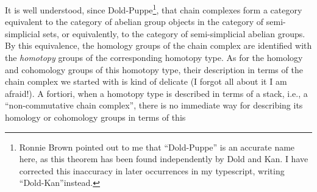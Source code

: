 It is well understood, since Dold-Puppe\footnote{Ronnie Brown pointed out to me that ``Dold-Puppe'' is an accurate name here, as this theorem has been found independently by Dold and Kan. I have corrected this inaccuracy in later occurrences in my typescript, writing ``Dold-Kan''instead.}, that chain complexes form a
category equivalent to the category of abelian group objects in the
category of semi-simplicial sets, or equivalently, to the category of
semi-simplicial abelian groups. By this equivalence, the homology
groups of the chain complex are identified with the \emph{homotopy}
groups of the corresponding homotopy type. As for the homology and
cohomology groups of this homotopy type, their description in terms of
the chain complex we started with is kind of delicate (I forgot all
about it I am afraid!). A fortiori, when a homotopy type is described
in terms of a stack, i.e., a ``non-commutative chain complex'', there
is no immediate way for describing its homology or cohomology groups
in terms of this
\clearpage
